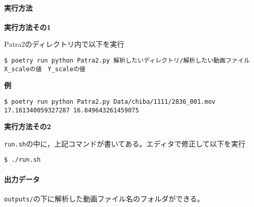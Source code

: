 \documentclass[]{jsarticle}
\newcommand{\passthrough}[1]{#1}
\begin{document}
\hypertarget{ux5b9fux884cux65b9ux6cd5}{%
\paragraph{実行方法}\label{ux5b9fux884cux65b9ux6cd5}}

\textbf{実行方法その1}

Patra2のディレクトリ内で以下を実行

\begin{lstlisting}
$ poetry run python Patra2.py 解析したいディレクトリ/解析したい動画ファイル　X_scaleの値　Y_scaleの値
\end{lstlisting}

\textbf{例}

\begin{lstlisting}
$ poetry run python Patra2.py Data/chiba/1111/2836_001.mov 17.161340059327287 16.849643261459075
\end{lstlisting}

\textbf{実行方法その2}

\passthrough{\lstinline!run.sh!}の中に，上記コマンドが書いてある。エディタで修正して以下を実行

\begin{lstlisting}
$ ./run.sh
\end{lstlisting}

\hypertarget{ux51faux529bux30c7ux30fcux30bf}{%
\paragraph{出力データ}\label{ux51faux529bux30c7ux30fcux30bf}}

\passthrough{\lstinline!outputs/!}の下に解析した動画ファイル名のフォルダができる。
\end{document}
